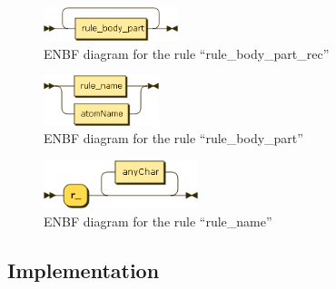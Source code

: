 \documentclass[a4paper,11pt]{report}
\newcommand{\ex}[3]{\prologfile[firstline=#1,lastline=#2]{#3.pl}}
\begin{document}
\begin{figure}[ht]
  \centering
  \includegraphics[width=0.35\textwidth]{figures/rule_body_part_rec}
  \caption{ENBF diagram for the rule ``rule\_body\_part\_rec''}
  \label{fig:rule_body_part_rec}
\end{figure}

\begin{figure}[ht]
  \centering
  \includegraphics[width=0.3\textwidth]{figures/rule_body_part}
  \caption{ENBF diagram for the rule ``rule\_body\_part''}
  \label{fig:rule_body_part}
\end{figure}

\begin{figure}[ht]
  \centering
  \includegraphics[width=0.4\textwidth]{figures/rule_name}
  \caption{ENBF diagram for the rule ``rule\_name''}
  \label{fig:rule_name}
\end{figure}

\FloatBarrier

\subsection*{Implementation}
\ex{11}{62}{ex3}
\end{document}

